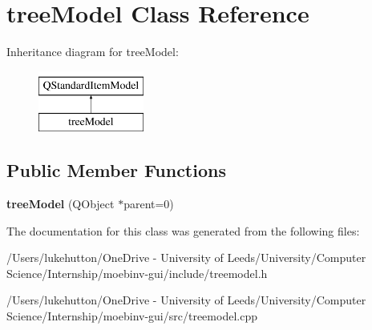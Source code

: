 \hypertarget{classtree_model}{}\section{tree\+Model Class Reference}
\label{classtree_model}
Inheritance diagram for tree\+Model\+:\begin{figure}[H]
\begin{center}
\leavevmode
\includegraphics[height=2.000000cm]{classtree_model}
\end{center}
\end{figure}
\subsection*{Public Member Functions}
\begin{DoxyCompactItemize}
\item 
\mbox{\label{classtree_model_ad3539d2628250edeea80fe4ffe0a80fa}} 
{\bfseries tree\+Model} (Q\+Object $\ast$parent=0)
\end{DoxyCompactItemize}


The documentation for this class was generated from the following files\+:\begin{DoxyCompactItemize}
\item 
/\+Users/lukehutton/\+One\+Drive -\/ University of Leeds/\+University/\+Computer Science/\+Internship/moebinv-\/gui/include/treemodel.\+h\item 
/\+Users/lukehutton/\+One\+Drive -\/ University of Leeds/\+University/\+Computer Science/\+Internship/moebinv-\/gui/src/treemodel.\+cpp\end{DoxyCompactItemize}
